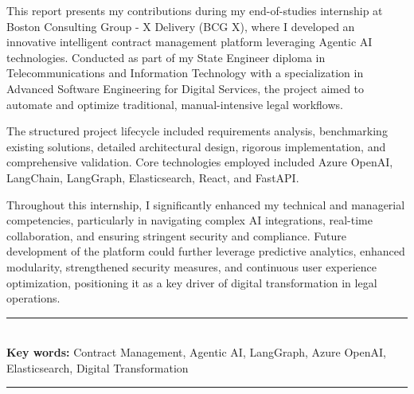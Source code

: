 This report presents my contributions during my end-of-studies internship at Boston Consulting Group - X Delivery (BCG X), where I developed an innovative intelligent contract management platform leveraging Agentic AI technologies. Conducted as part of my State Engineer diploma in Telecommunications and Information Technology with a specialization in Advanced Software Engineering for Digital Services, the project aimed to automate and optimize traditional, manual-intensive legal workflows.\mynewline

The structured project lifecycle included requirements analysis, benchmarking existing solutions, detailed architectural design, rigorous implementation, and comprehensive validation. Core technologies employed included Azure OpenAI, LangChain, LangGraph, Elasticsearch, React, and FastAPI.\mynewline

Throughout this internship, I significantly enhanced my technical and managerial competencies, particularly in navigating complex AI integrations, real-time collaboration, and ensuring stringent security and compliance. Future development of the platform could further leverage predictive analytics, enhanced modularity, strengthened security measures, and continuous user experience optimization, positioning it as a key driver of digital transformation in legal operations.

\bigskip

\noindent\rule{\textwidth}{0.3mm} \\[0.4cm]
\textbf{Key words:}
Contract Management, Agentic AI, LangGraph, Azure OpenAI, Elasticsearch, Digital Transformation
\\[0.1cm]
\noindent\rule{\textwidth}{0.3mm} \\[0.4cm]